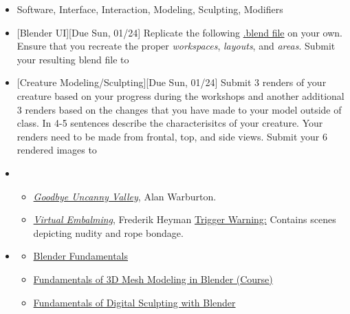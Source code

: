 \def\dMon{Mon, 01/18}
\def\dTues{Tues, 01/19}
\def\dWed{Wed, 01/20}
\def\dThur{Thur, 01/21}
\def\dFri{Fri, 01/22}
\def\dSat{Sat, 01/23}
\def\dSun{Sun, 01/24}
\placeDate

\begin{itemize}[noitemsep,topsep=0pt,leftmargin=*]
      \item {} Software, Interface, Interaction, Modeling, Sculpting, Modifiers
      \item {}[Blender UI][Due \dSun] Replicate the following \href{\#}{.blend file} on your own. Ensure that you recreate the proper \emph{workspaces}, \emph{layouts}, and \emph{areas}. Submit your resulting blend file to \discordE
      \item {}[Creature Modeling/Sculpting][Due \dSun] Submit 3 renders of your creature based on your progress during the workshops and another additional 3 renders based on the changes that you have made to your model outside of class. In 4-5 sentences describe the characterisitcs of your creature. Your renders need to be made from frontal, top, and side views. Submit your 6 rendered images to \discordE
      \item {}
            \begin{itemize}
                  \item \href{https://alanwarburton.co.uk/goodbye-uncanny-valley}{\emph{Goodbye Uncanny Valley}}, Alan Warburton.
                  \item \href{https://www.nowness.com/story/virtual-embalming-frederik-heyman}{\emph{Virtual Embalming}}, Frederik Heyman \newline
                        \small{\ul{Trigger Warning:} Contains scenes depicting nudity and rope bondage.}
            \end{itemize}
      \item {}
            \begin{resenv}
                  \begin{itemize}
                        \item \href{https://cloud.blender.org/p/blender-fundamentals/}{Blender Fundamentals}
                        \item \href{http://bit.ly/39jpRN5}{Fundamentals of 3D Mesh Modeling in Blender (Course)}
                        \item \href{http://bit.ly/38urSXu}{Fundamentals of Digital Sculpting with Blender}
                  \end{itemize}
            \end{resenv}
\end{itemize}